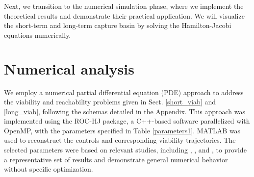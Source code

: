 \documentclass[]{interact}
\theoremstyle{plain}%
\theoremstyle{definition}
\theoremstyle{remark}
\begin{document}
Next, we transition to the numerical simulation phase, where we implement the theoretical results and demonstrate their practical application. We will visualize the short-term and long-term capture basin by solving the Hamilton-Jacobi equations numerically.





\section{Numerical analysis}
We employ a numerical partial differential equation (PDE) approach to address the viability and reachability problems given in Sect. \ref{short_viab} and \ref{long_viab}, following the schemas detailed in the Appendix. This approach was implemented using the ROC-HJ package, a C++-based software parallelized with OpenMP, with the parameters specified in Table \ref{parameters1}. MATLAB was used to reconstruct the controls and corresponding viability trajectories. The selected parameters were based on relevant studies, including \cite{sethi2008optimal}, \cite{anton2023dynamic}, and \cite{kaszkurewicz2018modeling}, to provide a representative set of results and demonstrate general numerical behavior without specific optimization.

\end{document}
